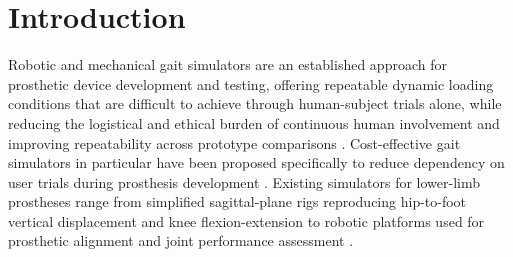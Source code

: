 \documentclass[journal,twocolumn,letterpaper]{IEEEJERM}
\begin{document}
{
  \renewcommand{\thefootnote}{}%
}

\IEEEpeerreviewmaketitle

\section{Introduction}

Robotic and mechanical gait simulators are an established approach for
prosthetic device development and testing, offering repeatable dynamic
loading conditions that are difficult to achieve through human-subject
trials alone, while reducing the logistical and ethical burden of
continuous human involvement and improving repeatability across
prototype comparisons \cite{Etoundi2022RoboticTestRig}. Cost-effective
gait simulators in particular have been proposed specifically to reduce
dependency on user trials during prosthesis development
\cite{Sudeesh2024CompactGaitSimulator}. Existing simulators for
lower-limb prostheses range from simplified sagittal-plane rigs
reproducing hip-to-foot vertical displacement and knee flexion-extension
\cite{Marinelli2015ConceptualDesign} to robotic platforms used for
prosthetic alignment and joint performance assessment
\cite{DeRaeve2014AlignmentTool,Etoundi2022RoboticTestRig}.
\end{document}
